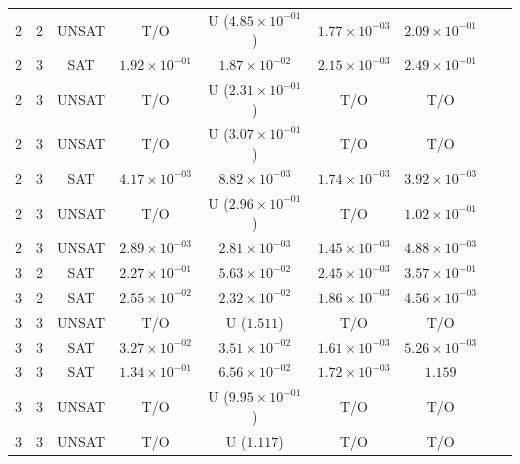 \begin{table}
\begin{tabular}{ccccccccc}
2 & 2 & UNSAT & T/O & U ($4.85 \times 10^{-01}$) & $1.77 \times 10^{-03}$ & $2.09 \times 10^{-01}$ \\
2 & 3 & SAT & $1.92 \times 10^{-01}$ & $1.87 \times 10^{-02}$ & $2.15 \times 10^{-03}$ & $2.49 \times 10^{-01}$ \\
2 & 3 & UNSAT & T/O & U ($2.31 \times 10^{-01}$) & T/O & T/O \\
2 & 3 & UNSAT & T/O & U ($3.07 \times 10^{-01}$) & T/O & T/O \\
2 & 3 & SAT & $4.17 \times 10^{-03}$ & $8.82 \times 10^{-03}$ & $1.74 \times 10^{-03}$ & $3.92 \times 10^{-03}$ \\
2 & 3 & UNSAT & T/O & U ($2.96 \times 10^{-01}$) & T/O & $1.02 \times 10^{-01}$ \\
2 & 3 & UNSAT & $2.89 \times 10^{-03}$ & $2.81 \times 10^{-03}$ & $1.45 \times 10^{-03}$ & $4.88 \times 10^{-03}$ \\
3 & 2 & SAT & $2.27 \times 10^{-01}$ & $5.63 \times 10^{-02}$ & $2.45 \times 10^{-03}$ & $3.57 \times 10^{-01}$ \\
3 & 2 & SAT & $2.55 \times 10^{-02}$ & $2.32 \times 10^{-02}$ & $1.86 \times 10^{-03}$ & $4.56 \times 10^{-03}$ \\
3 & 3 & UNSAT & T/O & U ($1.511$) & T/O & T/O \\
3 & 3 & SAT & $3.27 \times 10^{-02}$ & $3.51 \times 10^{-02}$ & $1.61 \times 10^{-03}$ & $5.26 \times 10^{-03}$ \\
3 & 3 & SAT & $1.34 \times 10^{-01}$ & $6.56 \times 10^{-02}$ & $1.72 \times 10^{-03}$ & $1.159$ \\
3 & 3 & UNSAT & T/O & U ($9.95 \times 10^{-01}$) & T/O & T/O \\
3 & 3 & UNSAT & T/O & U ($1.117$) & T/O & T/O \\
  \bottomrule
\end{tabular}
\end{table}


